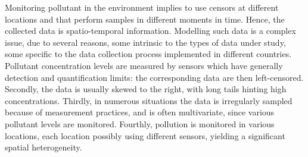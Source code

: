 Monitoring pollutant in the environment implies to use censors at different locations and that perform samples in different moments in time. Hence, the collected data is spatio-temporal information. Modelling such data is a complex issue, due to several reasons, some intrinsic to the types of data under study, some specific to the data collection process implemented in different countries. Pollutant concentration levels are measured by sensors which have generally detection and quantification limits: the corresponding data are then left-censored. Secondly, the data is usually skewed to the right, with long tails hinting high concentrations. Thirdly, in numerous situations the data is irregularly sampled because of measurement practices, and is often multivariate, since various pollutant levels are monitored. Fourthly, pollution is monitored in various locations, each location possibly using different sensors, yielding a significant spatial heterogeneity. 

